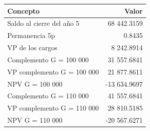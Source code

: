 \begin{tabular}{lr}
\toprule
Concepto & Valor \\
\midrule
Saldo al cierre del año 5 & 68 442.3159 \\
Permanencia 5p & 0.8435 \\
VP de los cargos & 8 242.8914 \\
Complemento G = 100 000 & 31 557.6841 \\
VP complemento G = 100 000 & 21 877.8611 \\
NPV G = 100 000 & -13 634.9697 \\
Complemento G = 110 000 & 41 557.6841 \\
VP complemento G = 110 000 & 28 810.5185 \\
NPV G = 110 000 & -20 567.6271 \\
\bottomrule
\end{tabular}
